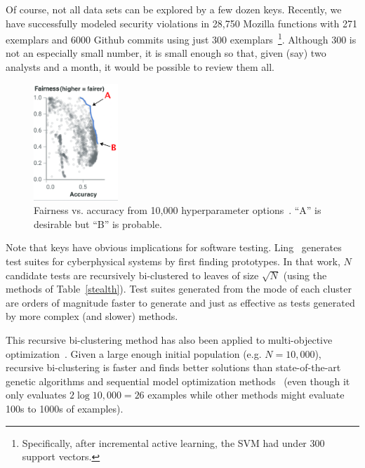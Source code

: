 \documentclass[sigconf,screen]{acmart}
\begin{document}
Of course, not all data sets can be explored by a few dozen keys. 
Recently,  we have successfully modeled security violations in 28,750 Mozilla functions with 271 exemplars and 6000 Github commits using just 300 exemplars~\cite{yu2019improving}\footnote{Specifically, after   incremental active
learning, the SVM had   under 300 support vectors.}. Although 300 is not an especially small
number, it is small enough so that, given (say) two analysts and a month, it would be possible
to review them all.

\begin{figure}
  \includegraphics[width=1.25in]{aof.png}
\caption{Fairness vs. accuracy from 10,000   hyperparameter options~\cite{cruz2021promoting}. ``A'' is desirable but ``B'' is probable.}\label{one}\end{figure} Note that keys  have obvious implications for software testing. Ling~\cite{ling2023benefits} generates test suites for cyberphysical systems by first finding prototypes. In that work, $N$  candidate  tests are recursively bi-clustered
  to leaves of size $\sqrt{N}$ (using the methods of Table~\ref{stealth}).
Test suites generated from the mode of each cluster are  orders of magnitude faster to generate and just as effective as tests generated
by   more complex (and slower)
methods.


This recursive bi-clustering method has
also been applied to multi-objective
optimization~\cite{agrawal2020better}.   Given
a large enough initial population (e.g. $N=10,000$), recursive bi-clustering is faster and finds better solutions than state-of-the-art genetic algorithms and sequential
model optimization methods~\cite{Chen19,lustosa2023optimizing}
(even though it only evaluates $2\log{10,000}=26$ examples while other methods
might evaluate 100s to 1000s of examples). 
\end{document}
